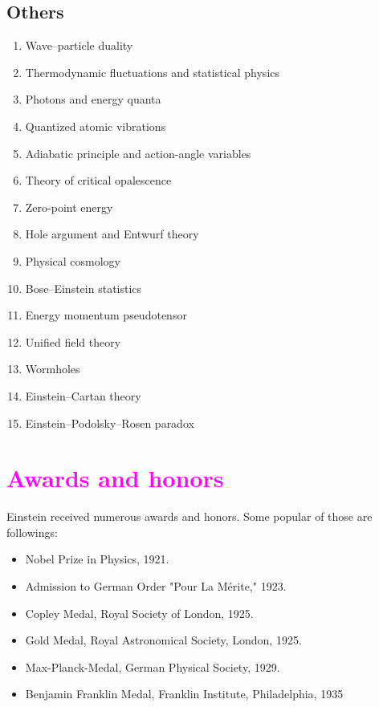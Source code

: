 \documentclass{article}
\begin{document}
\subsection{Others}
\begin{enumerate}
    \item Wave–particle duality
    \item Thermodynamic fluctuations and statistical physics
    \item Photons and energy quanta
    \item Quantized atomic vibrations
    \item Adiabatic principle and action-angle variables
    \item Theory of critical opalescence
    \item Zero-point energy
    \item Hole argument and Entwurf theory
    \item Physical cosmology
    \item Bose–Einstein statistics
    \item Energy momentum pseudotensor
    \item Unified field theory
    \item Wormholes
    \item Einstein–Cartan theory
    \item Einstein–Podolsky–Rosen paradox
\end{enumerate}



\section{\textcolor{magenta}{Awards and honors}}
Einstein received numerous awards and honors. Some popular of those are followings:

\begin{itemize}
    \item Nobel Prize in Physics, 1921. 
    \item Admission to German Order "Pour La Mérite," 1923. 
    \item Copley Medal, Royal Society of London, 1925. 
    \item Gold Medal, Royal Astronomical Society, London, 1925. 
    \item Max-Planck-Medal, German Physical Society, 1929. 
    \item Benjamin Franklin Medal, Franklin Institute, Philadelphia, 1935
\end{itemize}
\end{document}
